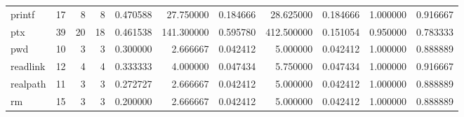 \begin{tabular}{lrrrrrrrrrr}
printf    &                                      17 &                  8 &                                 8 &                                   0.470588 &                              27.750000 &                                     0.184666 &                         28.625000 &                                0.184666 &                           1.000000 &                                           0.916667 \\
ptx       &                                      39 &                 20 &                                18 &                                   0.461538 &                             141.300000 &                                     0.595780 &                        412.500000 &                                0.151054 &                           0.950000 &                                           0.783333 \\
pwd       &                                      10 &                  3 &                                 3 &                                   0.300000 &                               2.666667 &                                     0.042412 &                          5.000000 &                                0.042412 &                           1.000000 &                                           0.888889 \\
readlink  &                                      12 &                  4 &                                 4 &                                   0.333333 &                               4.000000 &                                     0.047434 &                          5.750000 &                                0.047434 &                           1.000000 &                                           0.916667 \\
realpath  &                                      11 &                  3 &                                 3 &                                   0.272727 &                               2.666667 &                                     0.042412 &                          5.000000 &                                0.042412 &                           1.000000 &                                           0.888889 \\
rm        &                                      15 &                  3 &                                 3 &                                   0.200000 &                               2.666667 &                                     0.042412 &                          5.000000 &                                0.042412 &                           1.000000 &                                           0.888889 \\

\end{tabular}
